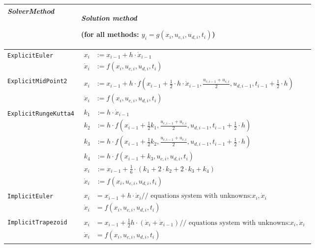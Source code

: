 \begin{longtable}[]{|p{3.5cm}|p{11cm}|}
\hline
\emph{SolverMethod} & 
\emph{Solution method}

(for all methods: $y_i=g(x_i,u_{c,i},u_{d,i},t_i)$)\\ \hline
\endhead
\lstinline[basicstyle=\ttfamily]!ExplicitEuler! & 
$\begin{aligned}
x_{i} &:= x_{i-1}+h\cdot\dot{x}_{i-1}\\
\dot{x}_{i} &:= f(x_i,u_{c,i},u_{d,i},t_i)
\end{aligned}$\\ \hline
\lstinline[basicstyle=\ttfamily]!ExplicitMidPoint2! &
$\begin{aligned}
x_{i} &:= x_{i-1}+h\cdot f(x_{i-1}+\frac{1}{2}\cdot h \cdot\dot{x}_{i-1},\frac{u_{c,i-1}+u_{c,i}}{2},u_{d,i-1},t_{i-1}+\tfrac{1}{2}\cdot h)\\
\dot{x}_{i} &:= f(x_i,u_{c,i},u_{d,i},t_i)
\end{aligned}$\\ \hline
\lstinline[basicstyle=\ttfamily]!ExplicitRungeKutta4! &
$\begin{aligned}
k_1 &:= h\cdot \dot{x}_{i-1}\\
k_2 &:= h\cdot f(x_{i-1}+\tfrac{1}{2}k_1,\frac{u_{c,i-1}+u_{c,i}}{2},u_{d,i-1},t_{i-1}+\tfrac{1}{2}\cdot h)\\
k_3 &:= h\cdot f(x_{i-1}+\tfrac{1}{2}k_2,\frac{u_{c,i-1}+u_{c,i}}{2},u_{d,i-1},t_{i-1}+\tfrac{1}{2}\cdot h)\\
k_4 &:= h\cdot f(x_{i-1}+k_3,u_{c,i},u_{d,i},t_i)\\
x_{i} &:= x_{i-1}+\tfrac{1}{6}\cdot(k_1+2\cdot k_2+2\cdot k_3+k_4)\\
\dot{x}_{i} &:= f(x_i,u_{c,i},u_{d,i},t_i)
\end{aligned}$
\\ \hline
\lstinline[basicstyle=\ttfamily]!ImplicitEuler! &$\begin{aligned}
x_{i} &= x_{i-1}+h\cdot\dot{x}_i \textrm{// equations system with unknowns:} x_i,\dot{x}_i\\
\dot{x}_{i} &= f(x_i,u_{c,i},u_{d,i},t_i)
\end{aligned}$\\ \hline
\lstinline[basicstyle=\ttfamily]!ImplicitTrapezoid! &$\begin{aligned}
x_{i} &= x_{i-1}+\tfrac{1}{2}h\cdot(\dot{x}_i+\dot{x}_{i-1}) \textrm{// equations system with unknowns:} x_i,\dot{x}_i\\
\dot{x}_{i} &= f(x_i,u_{c,i},u_{d,i},t_i)
\end{aligned}$\\ \hline
\end{longtable}


